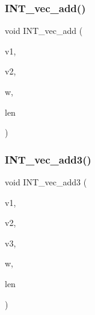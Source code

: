 \subsubsection{\texorpdfstring{I\+N\+T\+\_\+vec\+\_\+add()}{INT\_vec\_add()}}
{\footnotesize\ttfamily void I\+N\+T\+\_\+vec\+\_\+add (\begin{DoxyParamCaption}\item[{\mbox{\hyperlink{galois_8h_a09fddde158a3a20bd2dcadb609de11dc}{I\+NT}} $\ast$}]{v1,  }\item[{\mbox{\hyperlink{galois_8h_a09fddde158a3a20bd2dcadb609de11dc}{I\+NT}} $\ast$}]{v2,  }\item[{\mbox{\hyperlink{galois_8h_a09fddde158a3a20bd2dcadb609de11dc}{I\+NT}} $\ast$}]{w,  }\item[{\mbox{\hyperlink{galois_8h_a09fddde158a3a20bd2dcadb609de11dc}{I\+NT}}}]{len }\end{DoxyParamCaption})}

\mbox{\label{util_8_c_a5fb9f390a6d5ff2af38251ee134f12cf}} 
\subsubsection{\texorpdfstring{I\+N\+T\+\_\+vec\+\_\+add3()}{INT\_vec\_add3()}}
{\footnotesize\ttfamily void I\+N\+T\+\_\+vec\+\_\+add3 (\begin{DoxyParamCaption}\item[{\mbox{\hyperlink{galois_8h_a09fddde158a3a20bd2dcadb609de11dc}{I\+NT}} $\ast$}]{v1,  }\item[{\mbox{\hyperlink{galois_8h_a09fddde158a3a20bd2dcadb609de11dc}{I\+NT}} $\ast$}]{v2,  }\item[{\mbox{\hyperlink{galois_8h_a09fddde158a3a20bd2dcadb609de11dc}{I\+NT}} $\ast$}]{v3,  }\item[{\mbox{\hyperlink{galois_8h_a09fddde158a3a20bd2dcadb609de11dc}{I\+NT}} $\ast$}]{w,  }\item[{\mbox{\hyperlink{galois_8h_a09fddde158a3a20bd2dcadb609de11dc}{I\+NT}}}]{len }\end{DoxyParamCaption})}

\mbox{\label{util_8_c_a213a3e5aef54660073ad609492538df6}} 

